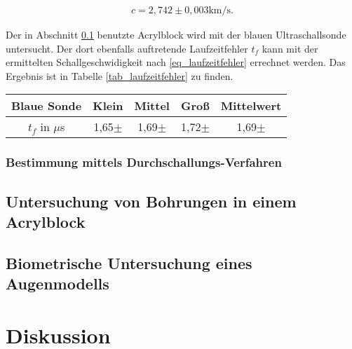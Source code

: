 \begin{align}
 c = 2,742\pm0,003 \text{km/s}.
\end{align}

Der in Abschnitt \ref{sec_bohrung} benutzte Acrylblock wird mit der blauen Ultraschallsonde untersucht. Der dort ebenfalls auftretende
Laufzeitfehler $t_f$ kann mit der ermittelten Schallgeschwidigkeit nach \eqref{eq_laufzeitfehler} errechnet werden. Das Ergebnis
ist in Tabelle \ref{tab_laufzeitfehler} zu finden.

\begin{table}[H]
 \begin{tabular}{c|c|c|c|c}
Blaue Sonde & Klein & Mittel & Groß & Mittelwert\\
 \hline
  $t_f$ in $\mu$s &1,65$\pm$	&1,69$\pm$	&1,72$\pm$ & 1,69$\pm$ \\
 \end{tabular}

\end{table}



\subsubsection{Bestimmung mittels Durchschallungs-Verfahren}
\subsection{Untersuchung von Bohrungen in einem Acrylblock}
\label{sec_bohrung}
\subsection{Biometrische Untersuchung eines Augenmodells}

\section{Diskussion}





